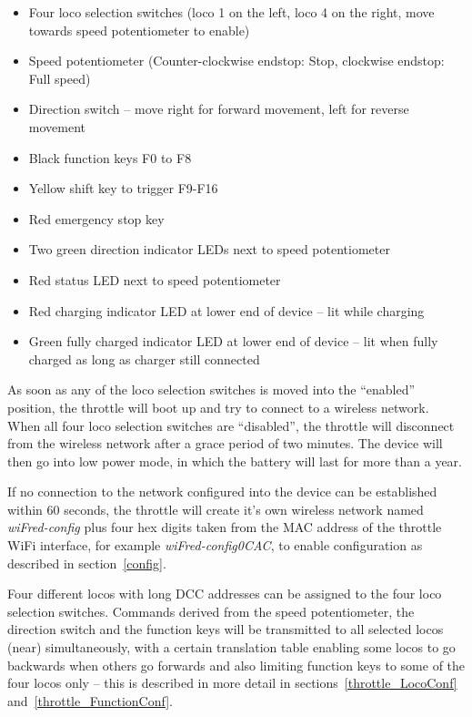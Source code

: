 \documentclass[11pt,a4paper]{scrartcl}
\begin{document}
\begin{itemize}
\item Four loco selection switches (loco 1 on the left, loco 4 on the right, move towards speed potentiometer to enable)
\item Speed potentiometer (Counter-clockwise endstop: Stop, clockwise endstop: Full speed)
\item Direction switch -- move right for forward movement, left for reverse movement
\item Black function keys F0 to F8
\item Yellow shift key to trigger F9-F16
\item Red emergency stop key
\item Two green direction indicator LEDs next to speed potentiometer
\item Red status LED next to speed potentiometer
\item Red charging indicator LED at lower end of device -- lit while charging
\item Green fully charged indicator LED at lower end of device -- lit when fully charged as long as charger still connected
\end{itemize}

As soon as any of the loco selection switches is moved into the ``enabled'' position, the throttle will boot up and try to connect to a wireless network. When all four loco selection switches are ``disabled'', the throttle will disconnect from the wireless network after a grace period of two minutes. The device will then go into low power mode, in which the battery will last for more than a year.

If no connection to the network configured into the device can be established within 60 seconds, the throttle will create it's own wireless network named \textit{wiFred-config} plus four hex digits taken from the MAC address of the throttle WiFi interface, for example \textit{wiFred-config0CAC}, to enable configuration as described in section~\ref{config}.

Four different locos with long DCC addresses can be assigned to the four loco selection switches. Commands derived from the speed potentiometer, the direction switch and the function keys will be transmitted to all selected locos (near) simultaneously, with a certain translation table enabling some locos to go backwards when others go forwards and also limiting function keys to some of the four locos only -- this is described in more detail in sections~\ref{throttle_LocoConf} and~\ref{throttle_FunctionConf}.
\end{document}
